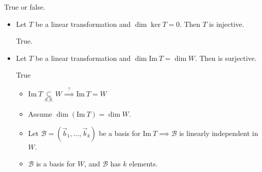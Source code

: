 \documentclass[11pt,fleqn]{book} %
\begin{document}
\begin{example}
    True or false. 
    
    \begin{itemize}
        \item Let $T$ be a linear transformation and $\dim \ker T = 0$. Then $T$ is injective. 

        True. 
        
        \item Let $T$ be a linear transformation and $\dim \mathrm{Im}~T = \dim W$. Then  is surjective. 
        
        True
        \begin{itemize}
            \item $\mathrm{Im}~T \underset{S.S.}{\subseteq} W \overset{?}{\implies} \mathrm{Im}~T = W$
            \item Assume $\dim\left( \mathrm{Im}~T \right) = \dim W$. 
            \item Let $\mathcal{B} = \left( \vec{b}_1, \dots, \vec{b}_k \right)$ be a basis for $\mathrm{Im}~T \implies \mathcal{B}$ is linearly independent in $W$. 
            \item $\mathcal{B}$ is a basis for $W$, and $\mathcal{B}$ has $k$ elements. 
        \end{itemize}
    \end{itemize}
\end{example}
\end{document}
